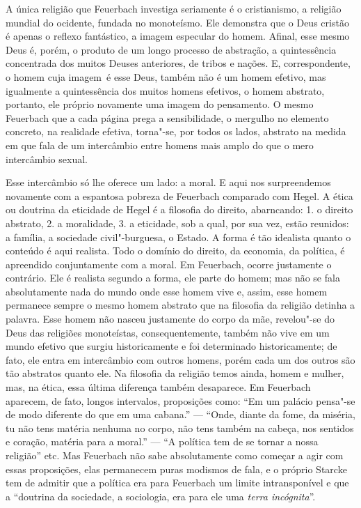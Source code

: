 A única religião
que Feuerbach investiga
seriamente é o cristianismo, a religião mundial do ocidente, fundada no
monoteísmo. Ele demonstra que o Deus cristão é apenas o reflexo
fantástico, a imagem especular do homem. Afinal, esse mesmo Deus é,
porém, o produto de um longo processo de abstração, a quintessência
concentrada dos muitos Deuses anteriores, de tribos e nações. E,
correspondente, o homem cuja imagem\est\ é esse Deus, também não é um homem
efetivo, mas igualmente a quintessência dos muitos homens efetivos, o
homem abstrato, portanto, ele próprio novamente uma imagem do
pensamento. O
mesmo Feuerbach que
a cada página prega a sensibilidade, o mergulho no elemento concreto, na
realidade efetiva, torna"-se, por todos os lados, abstrato na medida em
que fala de um intercâmbio entre homens mais amplo do que o mero
intercâmbio sexual.

Esse intercâmbio só lhe oferece um lado: a moral. E aqui nos
surpreendemos novamente com a espantosa pobreza
de Feuerbach comparado
com Hegel.
A ética ou doutrina da eticidade de Hegel é a filosofia do direito,
abarncando: 1. o direito abstrato, 2. a moralidade, 3. a eticidade, sob
a qual, por sua vez, estão reunidos: a família, a sociedade
civil"-burguesa, o Estado. A forma é tão idealista quanto o conteúdo é
aqui realista. Todo o domínio do direito, da economia, da política, é
apreendido conjuntamente com a moral.
Em Feuerbach,
ocorre justamente o contrário. Ele é realista segundo a forma, ele parte
do homem; mas não se fala absolutamente nada do mundo onde esse homem
vive e, assim, esse homem permanece sempre o mesmo homem abstrato que na
filosofia da religião detinha a palavra. Esse homem não nasceu
justamente do corpo da mãe, revelou"-se do Deus das religiões
monoteístas, consequentemente, também não vive em um mundo efetivo que
surgiu historicamente e foi determinado historicamente; de fato, ele
entra em intercâmbio com outros homens, porém cada um dos outros são tão
abstratos quanto ele. Na filosofia da religião temos ainda, homem e
mulher, mas, na ética, essa última diferença também desaparece.
Em Feuerbach
aparecem, de fato, longos intervalos, proposições como: ``Em um palácio
pensa"-se de modo diferente do que em uma cabana.'' --- ``Onde, diante da
fome, da miséria, tu não tens matéria nenhuma no corpo, não tens também
na cabeça, nos sentidos e coração, matéria
para a moral.'' --- ``A política tem de se tornar a nossa
religião'' etc.
Mas Feuerbach não
sabe absolutamente como começar a agir com essas proposições, elas
permanecem puras modismos de fala, e o próprio Starcke tem de admitir
que a política era
para Feuerbach um
limite intransponível e que a ``doutrina da sociedade, a sociologia, era
para ele uma \emph{terra
incógnita}''.

